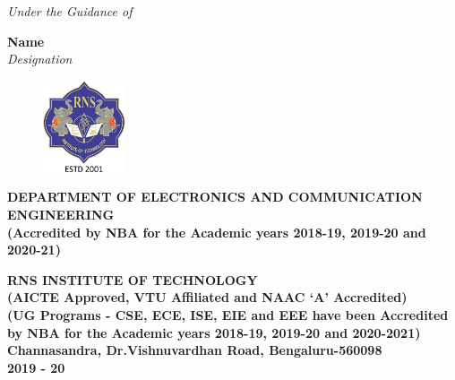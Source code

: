 \begin{titlingpage}
	\vspace{1cm}
	\textit{\color{white}Under the Guidance of}
	
	
	\Large{\textbf{\color{white}Name}}\\
	\textit{\color{white}Designation}\\
	
	\begin{figure}[h]
		\centering
		\includegraphics[height=2.7cm]{images/rns1.jpg}
	\end{figure}
	
	
	\begin{center}
		\scriptsize\textbf{\color{white}DEPARTMENT OF ELECTRONICS AND COMMUNICATION ENGINEERING}\\
		\small\textbf{\color{white}(Accredited by NBA for the Academic years 2018-19, 2019-20 and 2020-21)}	
	\end{center}
	\begin{center}
		\vspace{0.1cm}
		\large\textbf{\color{white}RNS INSTITUTE OF TECHNOLOGY}\\
		\small\textbf{\color{white}(AICTE Approved, VTU Affiliated and NAAC `A' Accredited)\\
			(UG Programs - CSE, ECE, ISE, EIE and EEE have been Accredited by NBA for the Academic years 2018-19, 2019-20 and 2020-2021)\\
			Channasandra, Dr.Vishnuvardhan Road, Bengaluru-560098\\
			2019 - 20}
	\end{center}
\end{titlingpage}
